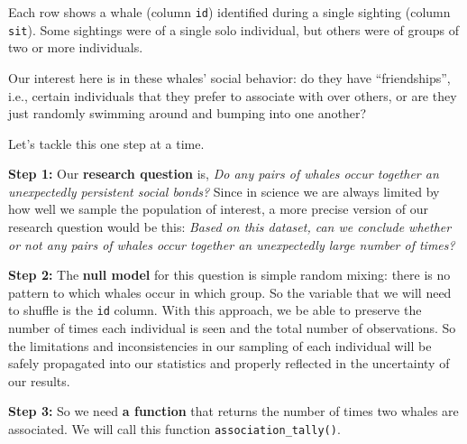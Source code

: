 \documentclass[
]{book}
\newenvironment{Shaded}{\begin{snugshade}}{\end{snugshade}}
\newcommand{\ControlFlowTok}[1]{\textcolor[rgb]{0.13,0.29,0.53}{\textbf{#1}}}
\newcommand{\KeywordTok}[1]{\textcolor[rgb]{0.13,0.29,0.53}{\textbf{#1}}}
\newcommand{\NormalTok}[1]{#1}
\newcommand{\OperatorTok}[1]{\textcolor[rgb]{0.81,0.36,0.00}{\textbf{#1}}}
\newcommand{\StringTok}[1]{\textcolor[rgb]{0.31,0.60,0.02}{#1}}
\begin{document}
Each row shows a whale (column \texttt{id}) identified during a single sighting (column \texttt{sit}). Some sightings were of a single solo individual, but others were of groups of two or more individuals.

Our interest here is in these whales' social behavior: do they have ``friendships'', i.e., certain individuals that they prefer to associate with over others, or are they just randomly swimming around and bumping into one another?

Let's tackle this one step at a time.

\textbf{Step 1:} Our \textbf{research question} is, \emph{Do any pairs of whales occur together an unexpectedly persistent social bonds?} Since in science we are always limited by how well we sample the population of interest, a more precise version of our research question would be this: \emph{Based on this dataset, can we conclude whether or not any pairs of whales occur together an unexpectedly large number of times?}

\textbf{Step 2:} The \textbf{null model} for this question is simple random mixing: there is no pattern to which whales occur in which group. So the variable that we will need to shuffle is the \texttt{id} column. With this approach, we be able to preserve the number of times each individual is seen and the total number of observations. So the limitations and inconsistencies in our sampling of each individual will be safely propagated into our statistics and properly reflected in the uncertainty of our results.

\textbf{Step 3:} So we need \textbf{a function} that returns the number of times two whales are associated. We will call this function \texttt{association\_tally()}.

\begin{Shaded}
\end{Shaded}
\end{document}
